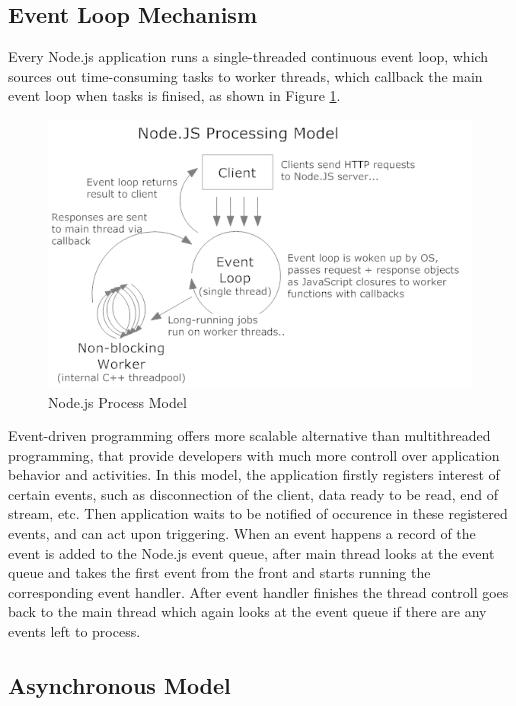\subsection{Event Loop Mechanism} %
\label{sub:event_loop_mechanism}
Every Node.js application runs a single-threaded continuous event loop, which sources out time-consuming tasks to worker threads, which callback the main event loop when tasks is finised, as shown in Figure \ref{fig:node_js_model}.
\begin{figure}[H]
\begin{center}
\captionsetup{font=small}
\includegraphics[scale=0.8]{pics/node_js_model.png}
\caption{Node.js Process Model\cite{node_js_pic}}
\label{fig:node_js_model}
\end{center}
\end{figure}
Event-driven programming offers more scalable alternative than multithreaded programming, that provide developers with much more controll over application behavior and activities. In this model, the application firstly registers interest of certain events, such as disconnection of the client, data ready to be read, end of stream, etc. Then application waits to be notified of occurence in these registered events, and can act upon triggering. \cite{7073454} When an event happens a record of the event is added to the Node.js event queue, after main thread  looks at the event queue and takes the first event from the front and starts running the corresponding event handler. After event handler finishes the thread controll goes back to the main thread which again looks at the event queue if there are any events left to process.\cite{5617064}
\subsection{Asynchronous Model} %
\label{sub:asynchronous_code}
